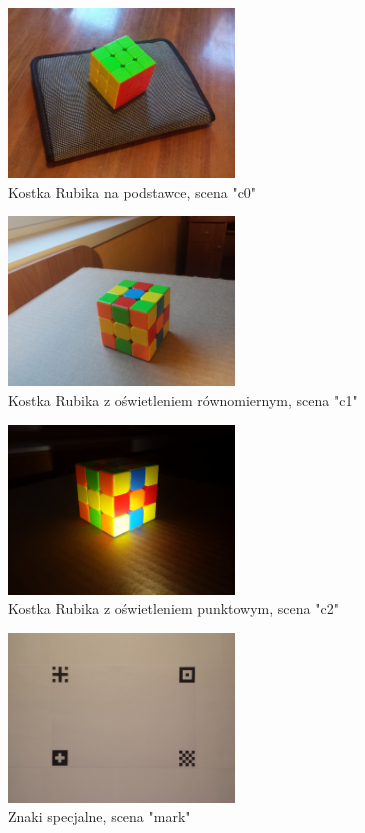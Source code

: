 \begin{figure}[h]
   \centering
   \includegraphics[width=6cm]{img/c0.jpg}
   \caption{Kostka Rubika na podstawce, scena "c0"}
   \label {fig:scene_c0}
\end{figure}
\begin{figure}[h]
   \centering
   \includegraphics[width=6cm]{img/c1.jpg}
   \caption{Kostka Rubika z oświetleniem równomiernym, scena "c1"}
   \label {fig:scene_c1}
\end{figure}
\begin{figure}[h]
   \centering
   \includegraphics[width=6cm]{img/c2.jpg}
   \caption{Kostka Rubika z oświetleniem punktowym, scena "c2"}
   \label {fig:scene_c2}
\end{figure}
\begin{figure}[h]
   \centering
   \includegraphics[width=6cm]{img/mark.jpg}
   \caption{Znaki specjalne, scena "mark"}
   \label {fig:scene_mark}
\end{figure}
